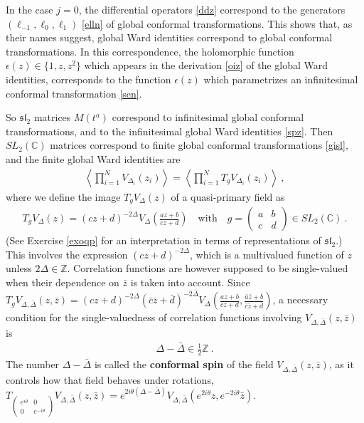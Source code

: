 \documentclass[12pt, a4paper, notitlepage, twoside]{report}
\numberwithin{equation}{section}
\theoremstyle{break}
\begin{document}
In the case $j=0$, the differential operators \eqref{ddz} correspond to the generators $(\ell_{-1},\ell_0,\ell_1)$ \eqref{elln} of global conformal transformations.
This shows that, as their names suggest, global Ward identities correspond to global conformal transformations.
In this correspondence, the holomorphic function $\epsilon(z)\in\{1,z,z^2\}$ which appears in the derivation \eqref{oiz} of the global Ward identities, corresponds to the function $\epsilon(z)$ which parametrizes an infinitesimal conformal transformation \eqref{sen}. 

So $\mathfrak{sl}_2$ matrices $M(t^a)$ correspond to infinitesimal global conformal transformations, and to the infinitesimal global Ward identities \eqref{spz}.
Then $SL_2({\mathbb{C}})$ matrices correspond to finite global conformal transformations \eqref{gisl}, and the finite global Ward identities are
\begin{align}
\left\langle \prod_{i=1}^N V_{\Delta_i}(z_i)\right\rangle  = \left\langle \prod_{i=1}^N T_g V_{\Delta_i}(z_i) \right\rangle \ , 
\label{vtv}
\end{align}
where we define the image $T_gV_\Delta(z)$ of a quasi-primary field as
\begin{align}
 \boxed{T_g V_\Delta(z) = (cz+d)^{-2\Delta} V_\Delta\left(\frac{az+b}{cz+d}\right)} \quad \text{with} \quad g = \left(\begin{array}{cc} a & b \\ c & d \end{array}\right) \in SL_2({\mathbb{C}})\ .
\label{tgv}
\end{align}
(See Exercise \ref{exoqp} for an interpretation in terms of representations of $\mathfrak{sl}_2$.)
This involves the expression $(cz+d)^{-2\Delta}$, which is a multivalued function of $z$ unless $2\Delta\in {\mathbb{Z}}$.
Correlation functions  are however supposed to be single-valued when their dependence on $\bar{z}$ is taken into account.
Since $T_g V_{\Delta,\bar{\Delta}}(z,\bar{z})= (cz+d)^{-2\Delta}(\bar c\bar z+\bar d)^{-2\bar\Delta} V_\Delta\left(\frac{az+b}{cz+d}, \frac{\bar a\bar z+ \bar b}{\bar c \bar z + \bar d}\right) $,
a necessary condition for the single-valuedness of correlation functions involving $V_{\Delta,\bar{\Delta}}(z,\bar{z})$ is
\begin{align}
 \boxed{\Delta-\bar{\Delta} \in \frac12 {\mathbb{Z}}}\ .
\label{dbd}
\end{align}
The number $\Delta-\bar{\Delta}$ is called the \textbf{conformal spin} of the field $V_{\Delta,\bar\Delta}(z,\bar z)$, as it controls how that field behaves under rotations, $T_{\left(\begin{smallmatrix} e^{i\theta} & 0 \\ 0 & e^{-i\theta} \end{smallmatrix}\right)} V_{\Delta,\bar{\Delta}}(z,\bar{z}) = e^{2i\theta(\Delta-\bar\Delta)} V_{\Delta,\bar{\Delta}}(e^{2i\theta} z,e^{-2i\theta}\bar{z})$.
\end{document}
